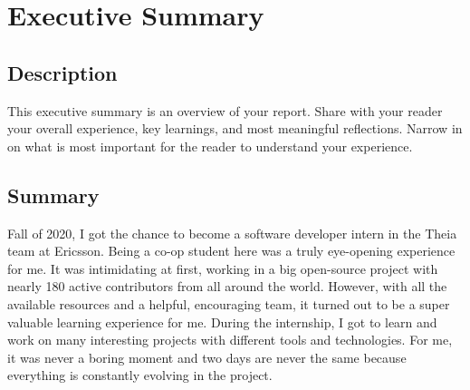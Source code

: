 \newpage
\section{Executive Summary}

\subsection{Description}

This executive summary is an overview of your report. Share with your reader your overall experience, key learnings, and most meaningful reflections. Narrow in on what is most important for the reader to understand your experience.

\subsection{Summary}

Fall of 2020, I got the chance to become a software developer intern in the Theia team at Ericsson.
Being a co-op student here was a truly eye-opening experience for me.
It was intimidating at first, working in a big open-source project with nearly 180 active contributors from all around the world.
However, with all the available resources and a helpful, encouraging team, it turned out to be a super valuable learning experience for me.
During the internship, I got to learn and work on many interesting projects with different tools and technologies.
For me, it was never a boring moment and two days are never the same because everything is constantly evolving in the project.



